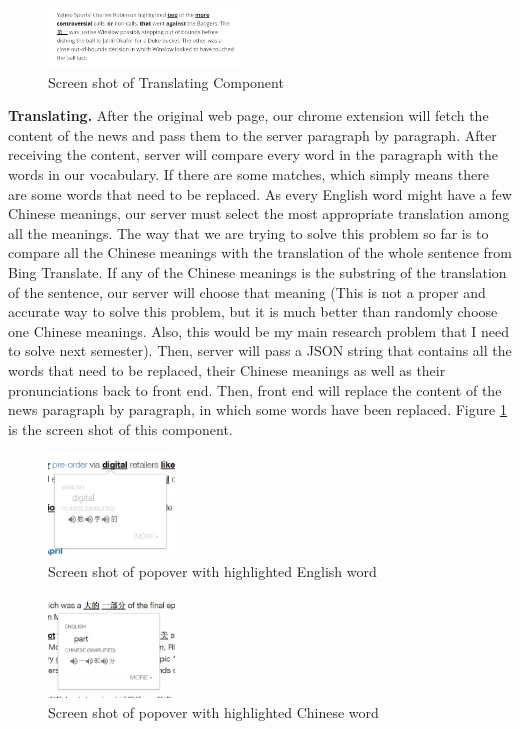 \begin{figure}[ht]
  \centering
  \includegraphics[width=0.45\textwidth]{software_design_2.jpg}
  \caption{Screen shot of Translating Component}
  \label{fig:software_design_2}
\end{figure}
{\bf Translating.} After the original web page, our chrome extension will fetch the content of the news and pass them to the server paragraph by paragraph. After receiving the content, server will compare every word in the paragraph with the words in our vocabulary. If there are some matches, which simply means there are some words that need to be replaced. As every English word might have a few Chinese meanings, our server must select the most appropriate translation among all the meanings. The way that we are trying to solve this problem so far is to compare all the Chinese meanings with the translation of the whole sentence from Bing Translate. If any of the Chinese meanings is the substring of the translation of the sentence, our server will choose that meaning (This is not a proper and accurate way to solve this problem, but it is much better than randomly choose one Chinese meanings. Also, this would be my main research problem that I need to solve next semester). Then, server will pass a JSON string that contains all the words that need to be replaced, their Chinese meanings as well as their pronunciations back to front end. Then, front end will replace the content of the news paragraph by paragraph, in which some words have been replaced. Figure \ref{fig:software_design_2} is the screen shot of this component.

\begin{figure}[ht]
  \centering
    \includegraphics[width=0.3\textwidth]{software_design_4.jpg}
  \caption{Screen shot of popover with highlighted English word}
  \label{fig:software_design_4}
\end{figure}

\begin{figure}[ht]
    \centering
    \includegraphics[width=0.3\textwidth]{software_design_5.jpg}
    \caption{Screen shot of popover with highlighted Chinese word}
    \label{fig:software_design_5}
\end{figure}

